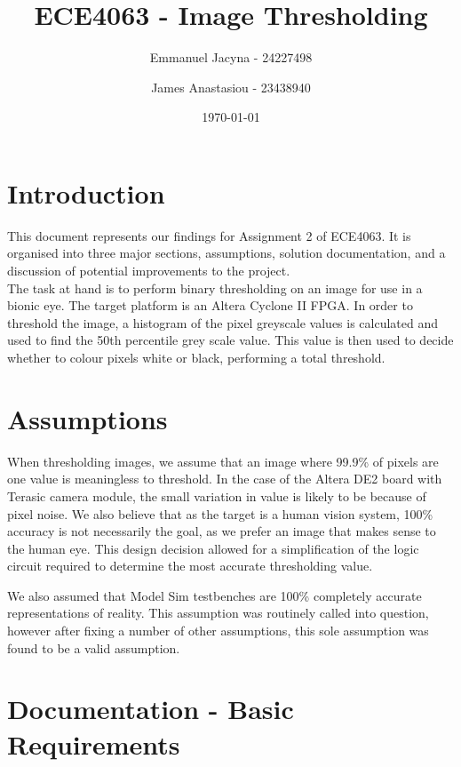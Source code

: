 \documentclass[12pt]{article}
\title{ECE4063 - Image Thresholding}
\author{Emmanuel Jacyna - 24227498 \and James Anastasiou - 23438940}
\date{\today}
\begin{document}
\pagestyle{myheadings}
  \maketitle
  \pagebreak
  \tableofcontents
  \pagebreak
  \section{Introduction}
  This document represents our findings for Assignment 2 of ECE4063. It is organised into three major sections, assumptions, solution documentation, and a discussion of potential improvements to the project.\\
  
  The task at hand is to perform binary thresholding on an image for use in a bionic eye. The target platform is an Altera Cyclone II FPGA. In order to threshold the image, a histogram of the pixel greyscale values is calculated and used to find the 50th percentile grey scale value. This value is then used to decide whether to colour pixels white or black, performing a total threshold.
  
  \section{Assumptions}
  When thresholding images, we assume that an image where 99.9\% of pixels are one value is meaningless to threshold. In the case of the Altera DE2 board with Terasic camera module, the small variation in value is likely to be because of pixel noise. We also believe that as the target is a human vision system, 100\% accuracy is not necessarily the goal, as we prefer an image that makes sense to the human eye. This design decision allowed for a simplification of the logic circuit required to determine the most accurate thresholding value. 
  
  We also assumed that Model Sim testbenches are 100\% completely accurate representations of reality. This assumption was routinely called into question, however after fixing a number of other assumptions, this sole assumption was found to be a valid assumption.
  
 
  \section{Documentation - Basic Requirements}
\end{document}

